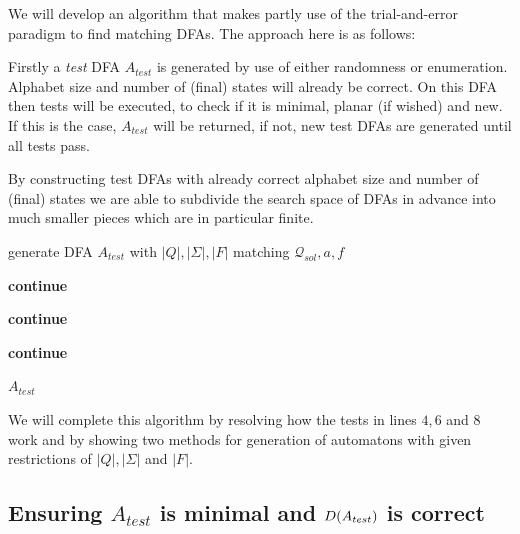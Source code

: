 We will develop an algorithm that makes partly use of the trial-and-error paradigm to find matching DFAs. The approach here is as follows:

Firstly a \emph{test} DFA $A_{test}$ is generated by use of either randomness or enumeration. Alphabet size and number of (final) states will already be correct. On this DFA then tests will be executed, to check if it is minimal, planar (if wished) and new. If this is the case, $A_{test}$ will be returned, if not, new test DFAs are generated until all tests pass.

By constructing test DFAs with already correct alphabet size and number of (final) states we are able to subdivide the search space of DFAs in advance into much smaller pieces which are in particular finite.


\vspace{0.2cm}
\begin{algorithmic}[1]
		
			\vspace{0.2cm}
		
			\State generate DFA $A_{test}$ with $|Q|, |\Sigma|, |F|$ matching $\mathcal{Q}_{sol}, a, f$
			
			\vspace{0.2cm}
			
				\State \textbf{continue}
			\EndIf
			
				\State \textbf{continue}
			\EndIf
			
				\State \textbf{continue}
			\EndIf
			
			\vspace{0.2cm}
			
			\State\Return $A_{test}$
		\EndWhile
	\EndFunction
\end{algorithmic}
\vspace{0.2cm}
We will complete this algorithm by resolving how the tests in lines $4, 6$ and $8$ work and by showing two methods for generation of automatons with given restrictions of $|Q|, |\Sigma|$ and $|F|$.

\subsection{Ensuring $A_{test}$ is minimal and $D(A_{test})$ is correct}

